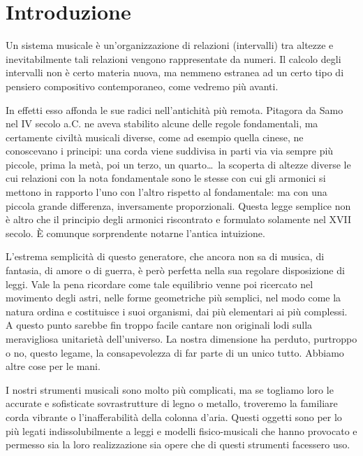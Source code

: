 \chapter*{Introduzione}

Un sistema musicale è un'organizzazione di relazioni (intervalli) tra altezze
e inevitabilmente tali relazioni vengono rappresentate da numeri. Il calcolo
degli intervalli non è certo materia nuova, ma nemmeno estranea ad un certo
tipo di pensiero compositivo contemporaneo, come vedremo più avanti.

In effetti esso affonda le sue radici nell'antichità più remota. Pitagora da
Samo nel IV secolo a.C. ne aveva stabilito alcune delle regole fondamentali,
ma certamente civiltà musicali diverse, come ad esempio quella cinese, ne
conoscevano i principi: una corda viene suddivisa in parti via via sempre più
piccole, prima la metà, poi un terzo, un quarto\dots\ la scoperta di altezze
diverse le cui relazioni con la nota fondamentale sono le stesse con cui gli
armonici si mettono in rapporto l'uno con l'altro rispetto al fondamentale: ma
con una piccola grande differenza, inversamente proporzionali. Questa legge
semplice non è altro che il principio degli armonici riscontrato e formulato
solamente nel XVII secolo. È comunque sorprendente notarne l'antica intuizione.

L'estrema semplicità di questo generatore, che ancora non sa di musica, di
fantasia, di amore o di guerra, è però perfetta nella sua regolare disposizione
di leggi. Vale la pena ricordare come tale equilibrio venne poi ricercato nel
movimento degli astri, nelle forme geometriche più semplici, nel modo come la
natura ordina e costituisce i suoi organismi, dai più elementari ai più
complessi. A questo punto sarebbe fin troppo facile cantare non originali lodi
sulla meravigliosa unitarietà dell'universo. La nostra dimensione ha perduto,
purtroppo o no, questo legame, la consapevolezza di far parte di un unico tutto.
Abbiamo altre cose per le mani.

I nostri strumenti musicali sono molto più complicati, ma se togliamo loro le
accurate e sofisticate sovrastrutture di legno o metallo, troveremo la familiare
corda vibrante o l'inafferabilità della colonna d'aria. Questi oggetti sono per
lo più legati indissolubilmente a leggi e modelli fisico-musicali che hanno
provocato e permesso sia la loro realizzazione sia opere che di questi strumenti
facessero uso.


